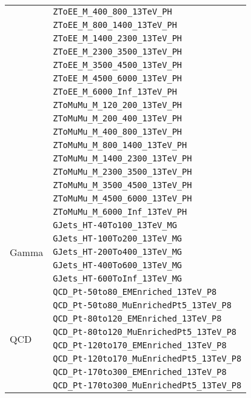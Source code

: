 \begin{longtable}{ll}
 & \texttt{ZToEE\_M\_400\_800\_13TeV\_PH} \\
 & \texttt{ZToEE\_M\_800\_1400\_13TeV\_PH} \\
 & \texttt{ZToEE\_M\_1400\_2300\_13TeV\_PH} \\
 & \texttt{ZToEE\_M\_2300\_3500\_13TeV\_PH} \\
 & \texttt{ZToEE\_M\_3500\_4500\_13TeV\_PH} \\
 & \texttt{ZToEE\_M\_4500\_6000\_13TeV\_PH} \\
 & \texttt{ZToEE\_M\_6000\_Inf\_13TeV\_PH} \\
 & \texttt{ZToMuMu\_M\_120\_200\_13TeV\_PH} \\
 & \texttt{ZToMuMu\_M\_200\_400\_13TeV\_PH} \\
 & \texttt{ZToMuMu\_M\_400\_800\_13TeV\_PH} \\
 & \texttt{ZToMuMu\_M\_800\_1400\_13TeV\_PH} \\
 & \texttt{ZToMuMu\_M\_1400\_2300\_13TeV\_PH} \\
 & \texttt{ZToMuMu\_M\_2300\_3500\_13TeV\_PH} \\
 & \texttt{ZToMuMu\_M\_3500\_4500\_13TeV\_PH} \\
 & \texttt{ZToMuMu\_M\_4500\_6000\_13TeV\_PH} \\
 & \texttt{ZToMuMu\_M\_6000\_Inf\_13TeV\_PH} \\
\midrule
\multirow{5}{*}{Gamma} & \texttt{GJets\_HT-40To100\_13TeV\_MG} \\
 & \texttt{GJets\_HT-100To200\_13TeV\_MG} \\
 & \texttt{GJets\_HT-200To400\_13TeV\_MG} \\
 & \texttt{GJets\_HT-400To600\_13TeV\_MG} \\
 & \texttt{GJets\_HT-600ToInf\_13TeV\_MG} \\
\midrule
\multirow{14}{*}{QCD} & \texttt{QCD\_Pt-50to80\_EMEnriched\_13TeV\_P8} \\
 & \texttt{QCD\_Pt-50to80\_MuEnrichedPt5\_13TeV\_P8} \\
 & \texttt{QCD\_Pt-80to120\_EMEnriched\_13TeV\_P8} \\
 & \texttt{QCD\_Pt-80to120\_MuEnrichedPt5\_13TeV\_P8} \\
 & \texttt{QCD\_Pt-120to170\_EMEnriched\_13TeV\_P8} \\
 & \texttt{QCD\_Pt-120to170\_MuEnrichedPt5\_13TeV\_P8} \\
 & \texttt{QCD\_Pt-170to300\_EMEnriched\_13TeV\_P8} \\
 & \texttt{QCD\_Pt-170to300\_MuEnrichedPt5\_13TeV\_P8} \\

\end{longtable}
